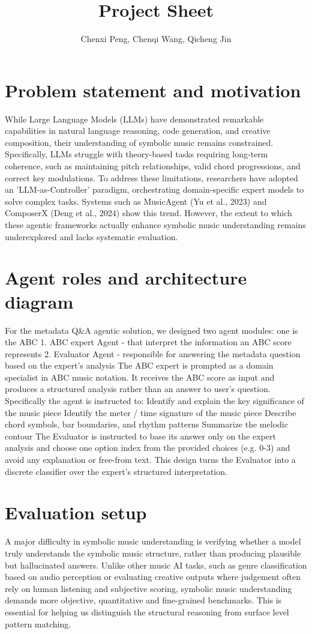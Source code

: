 \documentclass[11pt]{article} %
\title{Project Sheet}
\author{Chenxi Peng, Chenqi Wang, Qicheng Jin}
\begin{document}
\maketitle
\section{Problem statement and motivation} 
While Large Language Models (LLMs) have demonstrated remarkable capabilities in natural language reasoning, code generation, and creative composition, their understanding of symbolic music remains constrained. Specifically, LLMs struggle with theory-based tasks requiring long-term coherence, such as maintaining pitch relationships, valid chord progressions, and correct key modulations. To address these limitations, researchers have adopted an 'LLM-as-Controller' paradigm, orchestrating domain-specific expert models to solve complex tasks. Systems such as MusicAgent (Yu et al., 2023) and ComposerX (Deng et al., 2024) show this trend. However, the extent to which these agentic frameworks actually enhance symbolic music understanding remains underexplored and lacks systematic evaluation.

\section{Agent roles and architecture diagram}
For the metadata Q\&A agentic solution, we designed two agent modules: one is the ABC 1. ABC expert Agent - that interpret the information an ABC score represents 
2. Evaluator Agent - responsible for answering the metadata question based on the expert’s analysis
The ABC expert is prompted as a domain specialist in ABC music notation. It receives the ABC score as input and produces a structured analysis rather than an answer to user’s question. Specifically the agent is instructed to:
Identify and explain the key significance of the music piece
Identify the meter / time signature of the music piece 
Describe chord symbols, bar boundaries, and rhythm patterns
Summarize the melodic contour
The Evaluator is instructed to base its answer only on the expert analysis and choose one option index from the provided choices (e.g. 0-3) and avoid any explanation or free-from text. This design turns the Evaluator into a discrete classifier over the expert’s structured interpretation. 

\section{Evaluation setup}
 A major difficulty in symbolic music understanding is verifying whether a model truly understands the symbolic music structure, rather than producing plausible but hallucinated answers. Unlike other music AI tasks, such as genre classification based on audio perception or evaluating creative outputs where judgement often rely on human listening and subjective scoring, symbolic music understanding demands more objective, quantitative and fine-grained benchmarks. This is essential for helping us distinguish the structural reasoning from surface level pattern matching. 
\end{document}
